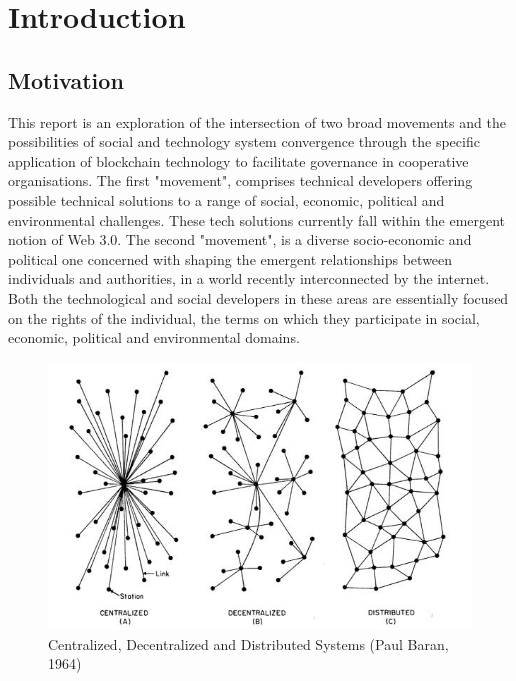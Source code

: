 
\chapter{Introduction} %

\label{Intorduction} %



\section{Motivation}
This report is an exploration of the intersection of two broad movements and the possibilities of social and technology system \cite{Sociotechnology} convergence through the specific application of blockchain technology to facilitate governance in cooperative organisations. The first "movement", comprises technical developers offering possible technical solutions to a range of social, economic, political and environmental challenges. These tech solutions currently fall within the emergent notion of Web 3.0. The second "movement", is a diverse socio-economic and political one concerned with shaping the emergent relationships between individuals and authorities, in a world recently interconnected by the internet. Both the technological and social developers in these areas are essentially focused on the rights of the individual, the terms on which they participate in social, economic, political and environmental domains.\\

\begin{figure}
\centering
\includegraphics[width=\textwidth]{Figures/baran_net}
\decoRule
\caption[networks]{Centralized, Decentralized and Distributed Systems (Paul Baran, 1964)}
\label{fig:Electron}
\end{figure}

